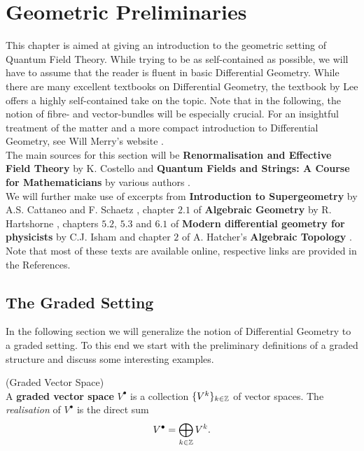 \section{Geometric Preliminaries}
\label{sec:Geometric_Preliminaries}

This chapter is aimed at giving an introduction to the geometric setting of Quantum Field Theory. While trying to be as self-contained as possible, we will have to assume that the reader is fluent in basic Differential Geometry. While there are many excellent textbooks on Differential Geometry, the textbook by Lee  offers a highly self-contained take on the topic. Note that in the following, the notion of fibre- and vector-bundles will be especially crucial. For an insightful treatment of the matter and a more compact introduction to Differential Geometry, see Will Merry's website .\\

The main sources for this section will be \textbf{Renormalisation and Effective Field Theory} by K. Costello  and \textbf{Quantum Fields and Strings:  A Course for Mathematicians} by various authors .\\

We will further make use of excerpts from \textbf{Introduction to Supergeometry} by A.S. Cattaneo and F. Schaetz , chapter $2.1$ of \textbf{Algebraic Geometry} by R. Hartshorne , chapters $5.2$, $5.3$ and $6.1$ of \textbf{Modern differential geometry for physicists} by C.J. Isham  and chapter $2$ of A. Hatcher's \textbf{Algebraic Topology} . Note that most of these texts are available online, respective links are provided in the References.

\subsection{The Graded Setting}

In the following section we will generalize the notion of Differential Geometry to a graded setting. To this end we start with the preliminary definitions of a graded structure and discuss some interesting examples.

\begin{definition} (Graded Vector Space)\\
  A \textbf{graded vector space} $V^\bullet$ is a collection $\{ V^k \}_{k\in\mathbb{Z}}$ of vector spaces. The \textit{realisation} of $V^\bullet$ is the direct sum
  $$ V^\bullet = \bigoplus_{k\in\mathbb{Z}} V^k .$$
\end{definition}

